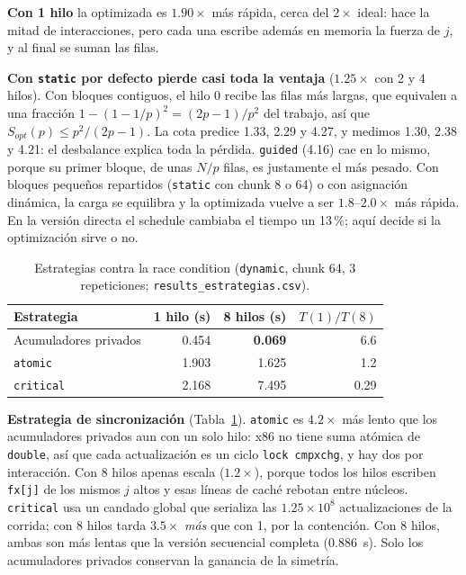 \documentclass[11pt,a4paper]{article}
\begin{document}
\textbf{Con 1 hilo} la optimizada es $1.90\times$ más rápida, cerca del $2\times$ ideal: hace la mitad de interacciones, pero cada una escribe además en memoria la fuerza de $j$, y al final se suman las filas.

\textbf{Con \texttt{static} por defecto pierde casi toda la ventaja} ($1.25\times$ con 2 y 4 hilos). Con bloques contiguos, el hilo 0 recibe las filas más largas, que equivalen a una fracción $1 - (1 - 1/p)^2 = (2p-1)/p^2$ del trabajo, así que $S_{opt}(p) \le p^2/(2p-1)$. La cota predice 1.33, 2.29 y 4.27, y medimos 1.30, 2.38 y 4.21: el desbalance explica toda la pérdida. \texttt{guided} (4.16) cae en lo mismo, porque su primer bloque, de unas $N/p$ filas, es justamente el más pesado. Con bloques pequeños repartidos (\texttt{static} con chunk 8 o 64) o con asignación dinámica, la carga se equilibra y la optimizada vuelve a ser $1.8$--$2.0\times$ más rápida. En la versión directa el schedule cambiaba el tiempo un 13\,\%; aquí decide si la optimización sirve o no.

\begin{table}[h!]
\centering
\caption{Estrategias contra la race condition (\texttt{dynamic}, chunk 64, 3 repeticiones; \texttt{results\_estrategias.csv}).}
\label{tab:estrategias}
\small
\begin{tabular}{@{}lrrr@{}}
\toprule
\textbf{Estrategia} & \textbf{1 hilo (s)} & \textbf{8 hilos (s)} & \textbf{$T(1)/T(8)$} \\ \midrule
Acumuladores privados & 0.454 & \textbf{0.069} & 6.6 \\
\texttt{atomic}       & 1.903 & 1.625 & 1.2 \\
\texttt{critical}     & 2.168 & 7.495 & 0.29 \\ \bottomrule
\end{tabular}
\end{table}

\textbf{Estrategia de sincronización} (Tabla~\ref{tab:estrategias}). \texttt{atomic} es $4.2\times$ más lento que los acumuladores privados aun con un solo hilo: x86 no tiene suma atómica de \texttt{double}, así que cada actualización es un ciclo \texttt{lock cmpxchg}, y hay dos por interacción. Con 8 hilos apenas escala ($1.2\times$), porque todos los hilos escriben \texttt{fx[j]} de los mismos $j$ altos y esas líneas de caché rebotan entre núcleos. \texttt{critical} usa un candado global que serializa las $1.25 \times 10^8$ actualizaciones de la corrida; con 8 hilos tarda $3.5\times$ \emph{más} que con 1, por la contención. Con 8 hilos, ambas son más lentas que la versión secuencial completa (0.886~s). Solo los acumuladores privados conservan la ganancia de la simetría.
\end{document}
